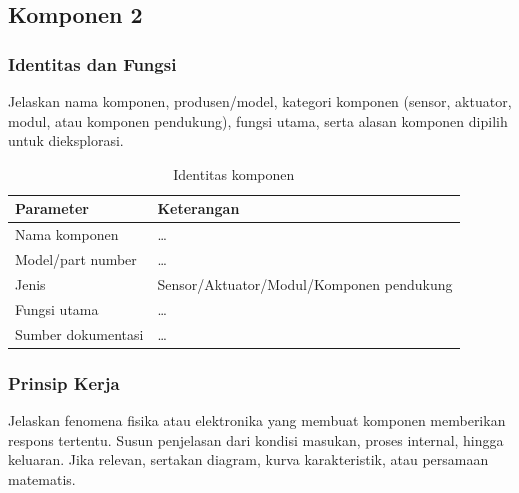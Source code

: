 
\subsection{Komponen 2}
\label{subsec:komponen-02}

\subsubsection{Identitas dan Fungsi}
Jelaskan nama komponen, produsen/model, kategori komponen (sensor, aktuator,
modul, atau komponen pendukung), fungsi utama, serta alasan komponen dipilih
untuk dieksplorasi.

\begin{table}[H]
\centering
\caption{Identitas komponen}
\begin{tabularx}{\textwidth}{@{}lX@{}}
\toprule
Parameter & Keterangan \\
\midrule
Nama komponen & \dots \\
Model/part number & \dots \\
Jenis & Sensor/Aktuator/Modul/Komponen pendukung \\
Fungsi utama & \dots \\
Sumber dokumentasi & \dots \\
\bottomrule
\end{tabularx}
\end{table}

\subsubsection{Prinsip Kerja}
Jelaskan fenomena fisika atau elektronika yang membuat komponen memberikan
respons tertentu. Susun penjelasan dari kondisi masukan, proses internal,
hingga keluaran. Jika relevan, sertakan diagram, kurva karakteristik, atau
persamaan matematis.


